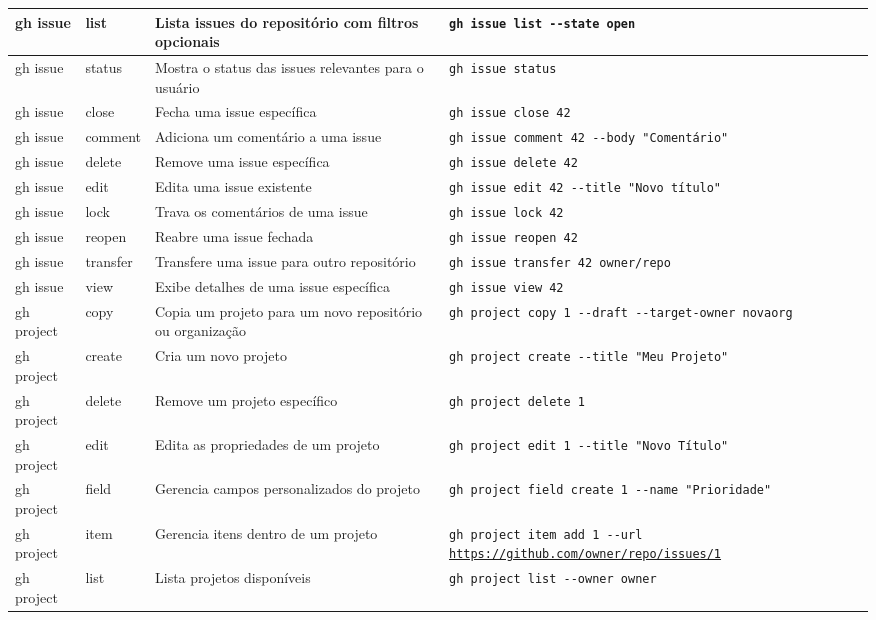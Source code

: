 \begin{longtable}{|p{2cm}|p{2.3cm}|p{4cm}|p{6cm}|}
    \hline
    gh issue & list & Lista issues do repositório com filtros opcionais & \texttt{gh issue list -{-}state open} \\
    \hline
    gh issue & status & Mostra o status das issues relevantes para o usuário & \texttt{gh issue status} \\
    \hline
    gh issue & close & Fecha uma issue específica & \texttt{gh issue close 42} \\
    \hline
    gh issue & comment & Adiciona um comentário a uma issue & \texttt{gh issue comment 42 -{-}body "Comentário"} \\
    \hline
    gh issue & delete & Remove uma issue específica & \texttt{gh issue delete 42} \\
    \hline
    gh issue & edit & Edita uma issue existente & \texttt{gh issue edit 42 -{-}title "Novo título"} \\
    \hline
    gh issue & lock & Trava os comentários de uma issue & \texttt{gh issue lock 42} \\
    \hline
    gh issue & reopen & Reabre uma issue fechada & \texttt{gh issue reopen 42} \\
    \hline
    gh issue & transfer & Transfere uma issue para outro repositório & \texttt{gh issue transfer 42 owner/repo} \\
    \hline
    gh issue & view & Exibe detalhes de uma issue específica & \texttt{gh issue view 42} \\
    \hline
    gh project & copy & Copia um projeto para um novo repositório ou organização & \texttt{gh project copy 1 -{-}draft -{-}target-owner novaorg} \\
    \hline
    gh project & create & Cria um novo projeto & \texttt{gh project create -{-}title "Meu Projeto"} \\
    \hline
    gh project & delete & Remove um projeto específico & \texttt{gh project delete 1} \\
    \hline
    gh project & edit & Edita as propriedades de um projeto & \texttt{gh project edit 1 -{-}title "Novo Título"} \\
    \hline
    gh project & field & Gerencia campos personalizados do projeto & \texttt{gh project field create 1 -{-}name "Prioridade"} \\
    \hline
    gh project & item & Gerencia itens dentro de um projeto & \texttt{gh project item add 1 -{-}url \url{https://github.com/owner/repo/issues/1}} \\
    \hline
    gh project & list & Lista projetos disponíveis & \texttt{gh project list -{-}owner owner} \\

\end{longtable}
